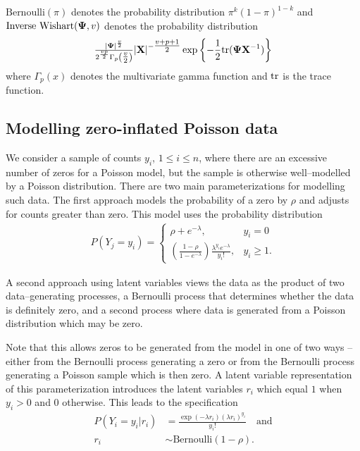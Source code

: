 $\text{Bernoulli}(\pi)$ denotes the probability distribution $\pi^k (1 - \pi)^{1-k}$ and
$\text{Inverse Wishart}({\boldsymbol \Psi}, v)$ denotes the probability distribution
$$\tfrac{|{\boldsymbol \Psi}|^\frac{v}{2}}{2^{\frac{vp}{2}} \Gamma_p{\left(\tfrac{v}{2}\right)}} |{\bf X}|^{-\tfrac{v + p + 1}{2}}
\exp{\left\{-\frac{1}{2} \text{tr}{({\boldsymbol\Psi}{\bf X}^{-1})}\right\}}$$ where $\Gamma_p{(x)}$ denotes the multivariate gamma function and $\text{tr}$
is the trace function.

\subsection{Modelling zero-inflated Poisson data}

We consider a sample of counts $y_i$, $1 \le i\le n$, where there are an excessive number of zeros for a
Poisson model, but the sample is otherwise well--modelled by a Poisson distribution. There are two main
parameterizations for modelling such data. The first approach models the probability of a zero by $\rho$ and
adjusts for counts greater than zero. This model uses the probability distribution
$$
\begin{array}{rll}
	P(Y_j = y_i) = \begin{cases}
	\rho + e^{-\lambda}, &y_i = 0\\
	\left( \frac{1 - \rho}{1 - e^{-\lambda}} \right) \frac{\lambda^{y_i} e^{-\lambda}} {y_i!}, &y_i \ge 1.
	\end{cases}
\end{array}
$$

A second approach using latent variables views the data as the product of two data--generating processes, a
Bernoulli process that determines whether the data is definitely zero, and a second process where data is
generated from a Poisson distribution which may be zero.

Note that this allows zeros to be generated from the model in one of two ways -- either from the Bernoulli
process generating a zero or from the Bernoulli process generating a Poisson sample which is then zero.
A latent variable representation of this parameterization introduces the latent variables $r_i$ which
equal $1$ when $y_i>0$ and $0$ otherwise. This leads to the specification
$$
\begin{array}{rl}
	P(Y_i=y_i|r_i) &= \frac{\exp(-\lambda r_i)(\lambda r_i)^{y_i}}{y_i!} \quad \mbox{and} \\
	r_i &\sim \mbox{Bernoulli}(1-\rho).
\end{array}
$$

